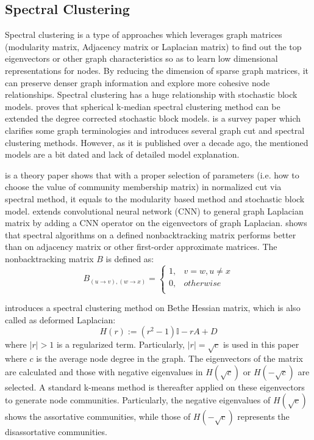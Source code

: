 \subsection{Spectral Clustering}
Spectral clustering is a type of approaches which leverages  graph matrices (modularity matrix, Adjacency matrix or Laplacian matrix) to find out the top eigenvectors or other graph characteristics so as to learn low dimensional representations for nodes. By reducing the dimension of sparse graph matrices, it can preserve denser graph information and explore more cohesive node relationships. Spectral clustering has a huge relationship with stochastic block models. \cite{lei2015consistency} proves that spherical k-median spectral clustering method can be extended the degree corrected stochastic block models. \cite{nascimento2011spectral} is a survey paper which clarifies some graph terminologies and introduces several graph cut and spectral clustering methods. However, as it is published over a decade ago, the mentioned models are a bit dated and lack of detailed model explanation.

\cite{newman2013spectral} is a theory paper shows that with a proper selection of parameters (i.e. how to choose the value of community membership matrix) in normalized cut via spectral method, it equals to the modularity based method and stochastic block model. \cite{bruna2013spectral} extends convolutional neural network (CNN) to general graph Laplacian matrix by adding a CNN operator on the eigenvectors of graph Laplacian. \cite{krzakala2013spectral} shows that spectral algorithms on a defined nonbacktracking matrix performs better than on adjacency matrix or other first-order approximate matrices. The nonbacktracking matrix $B$ is defined as:
\begin{equation}
B_{(u\rightarrow v),(w\rightarrow x)} = 
\begin{cases}
1,&   v = w,u \neq x\\ 
0,  & otherwise\\  
\end{cases}
\end{equation}

 \cite{saade2014spectral} introduces a spectral clustering method on Bethe Hessian matrix, which is also called as deformed Laplacian:
\begin{equation}
	H(r) :=(r^2-1)\mathbb{I}- rA + D 
\end{equation}
where $|r|>1$ is a regularized term. Particularly, $|r| = \sqrt{c}$ is used in this paper where $c$ is the average node degree in the graph. The eigenvectors of the matrix are calculated and those with negative eigenvalues in $H(\sqrt{c})$ or $H(-\sqrt{c})$ are selected. A standard k-means method is thereafter applied on these eigenvectors to generate node communities. Particularly, the negative eigenvalues of $H(\sqrt{c})$ shows the assortative communities, while those of $H(-\sqrt{c})$ represents the disassortative communities.

